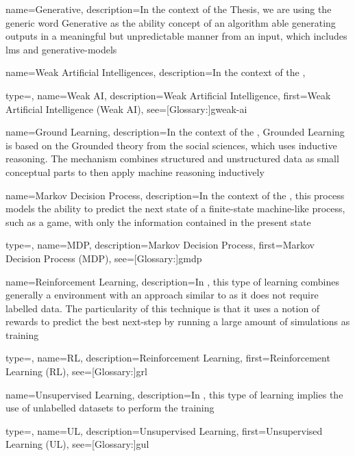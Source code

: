 {
  name={Generative},
  description={In the context of the Thesis, we are using the generic word Generative as the ability concept of an algorithm able generating outputs in a meaningful but unpredictable manner from an input, which includes \glspl{lm} and \glspl{generative-model}}
}

{
  name={Weak Artificial Intelligences},
  description={In the context of the , }
}

{
  type=\acronymtype,
  name={Weak AI},
  description={Weak Artificial Intelligence},
  first={Weak Artificial Intelligence (Weak AI)},
  see=[Glossary:]{gweak-ai}
}

{
  name={Ground Learning},
  description={In the context of the , Grounded Learning is based on the Grounded theory from the social sciences, which uses inductive reasoning. The mechanism combines structured and unstructured data as small conceptual parts to then apply machine reasoning inductively}
}


{
  name={Markov Decision Process},
  description={In the context of the , this process models the ability to predict the next state of a finite-state machine-like process, such as a game, with only the information contained in the present state}
}

{
  type=\acronymtype,
  name={MDP},
  description={Markov Decision Process},
  first={Markov Decision Process (MDP)},
  see=[Glossary:]{gmdp}
}

{
  name={Reinforcement Learning},
  description={In , this type of learning combines generally a  environment with an approach similar to  as it does not require labelled data. The particularity of this technique is that it uses a notion of rewards to predict the best next-step by running a large amount of simulations as training}
}

{
  type=\acronymtype,
  name={RL},
  description={Reinforcement Learning},
  first={Reinforcement Learning (RL)},
  see=[Glossary:]{grl}
}

{
  name={Unsupervised Learning},
  description={In , this type of learning implies the use of unlabelled datasets to perform the training}
}

{
  type=\acronymtype,
  name={UL},
  description={Unsupervised Learning},
  first={Unsupervised Learning (UL)},
  see=[Glossary:]{gul}
}

